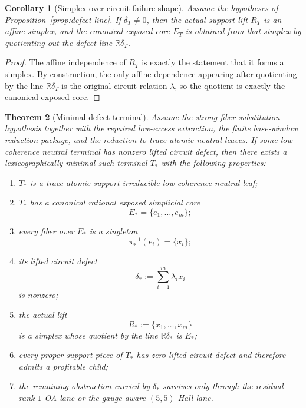 \documentclass[11pt]{article}
\newtheorem{theorem}{Theorem}[section]
\newtheorem{corollary}[theorem]{Corollary}
\theoremstyle{definition}
\newcommand{\R}{\mathbb{R}}
\newcommand{\1}{\mathbf{1}}
\begin{document}
\begin{corollary}[Simplex-over-circuit failure shape]\label{cor:simplex-over-circuit}
Assume the hypotheses of Proposition~\ref{prop:defect-line}. If $\delta_T\neq 0$, then the actual support lift $R_T$ is an affine simplex, and the canonical exposed core $E_T$ is obtained from that simplex by quotienting out the defect line $\R\delta_T$.
\end{corollary}

\begin{proof}
The affine independence of $R_T$ is exactly the statement that it forms a simplex. By construction, the only affine dependence appearing after quotienting by the line $\R\delta_T$ is the original circuit relation $\lambda$, so the quotient is exactly the canonical exposed core.
\end{proof}

\begin{theorem}[Minimal defect terminal]\label{thm:minimal-defect-terminal}
Assume the strong fiber substitution hypothesis together with the repaired low-excess extraction, the finite base-window reduction package, and the reduction to trace-atomic neutral leaves. If some low-coherence neutral terminal has nonzero lifted circuit defect, then there exists a lexicographically minimal such terminal $T_*$ with the following properties:
\begin{enumerate}[label=(\roman*),leftmargin=2.2em]
\item $T_*$ is a trace-atomic support-irreducible low-coherence neutral leaf;
\item $T_*$ has a canonical rational exposed simplicial core
\[
E_*=\{e_1,\dots,e_m\};
\]
\item every fiber over $E_*$ is a singleton
\[
\pi_*^{-1}(e_i)=\{x_i\};
\]
\item its lifted circuit defect
\[
\delta_*:=\sum_{i=1}^m \lambda_i x_i
\]
is nonzero;
\item the actual lift
\[
R_*:=\{x_1,\dots,x_m\}
\]
is a simplex whose quotient by the line $\R\delta_*$ is $E_*$;
\item every proper support piece of $T_*$ has zero lifted circuit defect and therefore admits a profitable child;
\item the remaining obstruction carried by $\delta_*$ survives only through the residual rank-$1$ OA lane or the gauge-aware $(5,5)$ Hall lane.
\end{enumerate}
\end{theorem}
\end{document}
